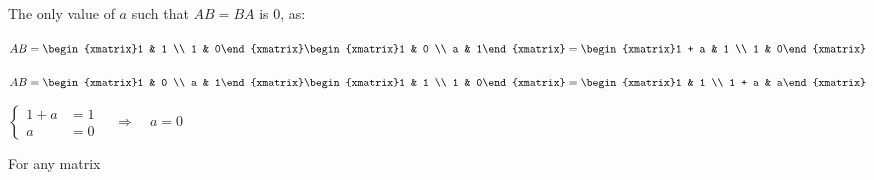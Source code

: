 
\begin{exercise}{8}
  The only value of $a$ such that $AB = BA$ is $0$, as:
  \medskip
  
  $AB = \begin{xmatrix}1 & 1 \\ 1 & 0\end{xmatrix}
        \begin{xmatrix}1 & 0 \\ a & 1\end{xmatrix}
      = \begin{xmatrix}1 + a & 1 \\ 1 & 0\end{xmatrix}$
  \medskip
  
  $AB = \begin{xmatrix}1 & 0 \\ a & 1\end{xmatrix}
        \begin{xmatrix}1 & 1 \\ 1 & 0\end{xmatrix}
      = \begin{xmatrix}1 & 1 \\ 1 + a & a\end{xmatrix}$
  \medskip
  
  $\left\{
    \begin{aligned}
      1 + a &= 1 \\
          a &= 0
    \end{aligned}
  \right.\quad \Longrightarrow \quad a = 0$
\end{exercise}

\begin{exercise}{10}
  For any matrix
\end{exercise}

